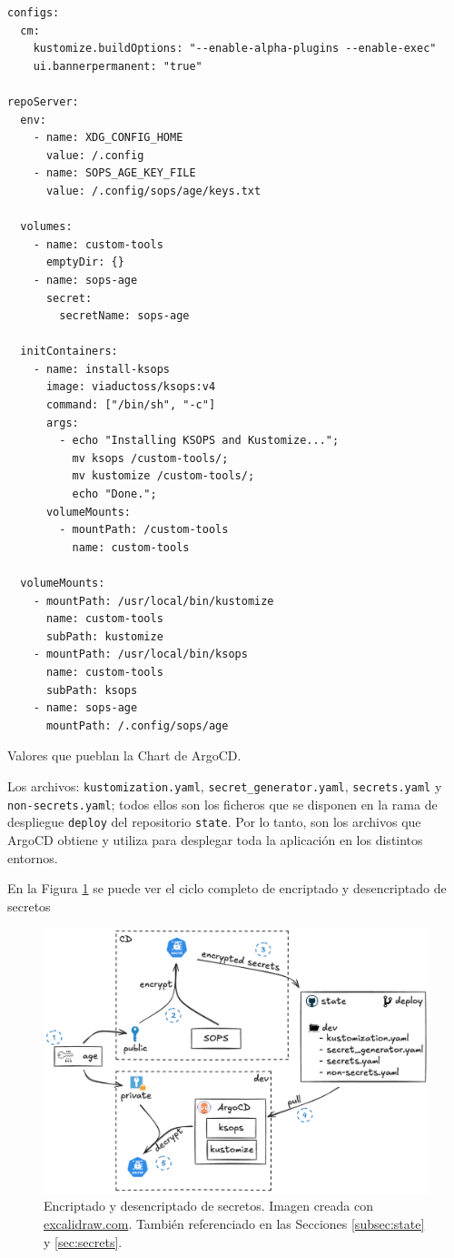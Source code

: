 \begin{longlisting}
  \begin{verbatim}
configs:
  cm:
    kustomize.buildOptions: "--enable-alpha-plugins --enable-exec"
    ui.bannerpermanent: "true"

repoServer:
  env:
    - name: XDG_CONFIG_HOME
      value: /.config
    - name: SOPS_AGE_KEY_FILE
      value: /.config/sops/age/keys.txt

  volumes:
    - name: custom-tools
      emptyDir: {}
    - name: sops-age
      secret:
        secretName: sops-age

  initContainers:
    - name: install-ksops
      image: viaductoss/ksops:v4
      command: ["/bin/sh", "-c"]
      args:
        - echo "Installing KSOPS and Kustomize...";
          mv ksops /custom-tools/;
          mv kustomize /custom-tools/;
          echo "Done.";
      volumeMounts:
        - mountPath: /custom-tools
          name: custom-tools

  volumeMounts:
    - mountPath: /usr/local/bin/kustomize
      name: custom-tools
      subPath: kustomize
    - mountPath: /usr/local/bin/ksops
      name: custom-tools
      subPath: ksops
    - name: sops-age
      mountPath: /.config/sops/age
    \end{verbatim}
    \caption{Valores que pueblan la Chart de ArgoCD.}
    \label{lst:argo-values}
\end{longlisting}

Los archivos: \texttt{kustomization.yaml}, \texttt{secret\_generator.yaml}, \texttt{secrets.yaml} y \texttt{non-secrets.yaml}; todos ellos son los ficheros que se disponen en la rama de despliegue \texttt{deploy} del repositorio \texttt{state}. Por lo tanto, son los archivos que ArgoCD obtiene y utiliza para desplegar toda la aplicación en los distintos entornos.

En la Figura \ref{fig:secrets} se puede ver el ciclo completo de encriptado y desencriptado de secretos

\begin{figure}
  \centerline{\includegraphics[width=13.5cm]{figuras/secrets}}
  \caption{Encriptado y desencriptado de secretos. Imagen creada con \href{https://excalidraw.com}{excalidraw.com}. También referenciado en las Secciones \ref{subsec:state} y \ref{sec:secrets}.}
  \label{fig:secrets}
\end{figure}

